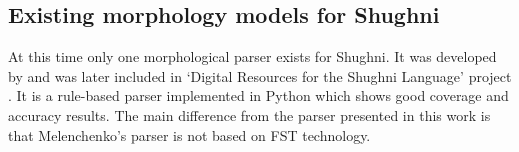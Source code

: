 \subsection{Existing morphology models for Shughni}
At this time only one morphological parser exists for Shughni. It was developed by \textcite{melenchenko_2021_parser} and was later included in `Digital Resources for the Shughni Language' project \parencite{makarov_digital_2022}. It is a rule-based parser implemented in Python which shows good coverage and accuracy results. The main difference from the parser presented in this work is that Melenchenko's parser is not based on FST technology.